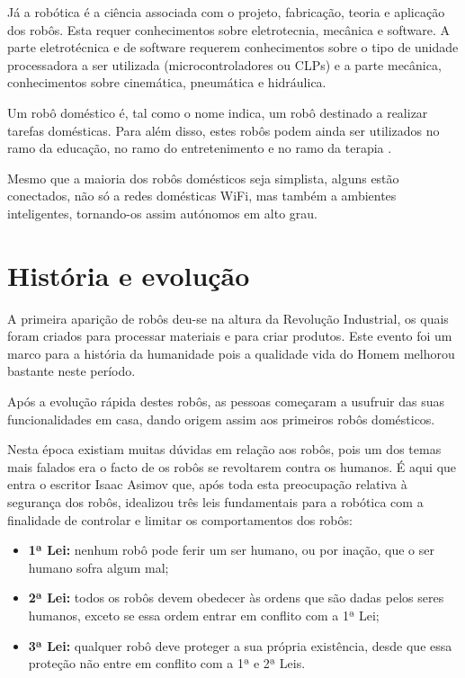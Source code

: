 \documentclass[10pt]{article}
\begin{document}
Já a robótica é a ciência associada com o projeto, fabricação, teoria e aplicação dos robôs. Esta requer conhecimentos sobre eletrotecnia, mecânica e software. A parte eletrotécnica e de software requerem conhecimentos sobre o tipo de unidade processadora a ser utilizada (microcontroladores ou CLPs) e a parte mecânica, conhecimentos sobre cinemática, pneumática e hidráulica.

Um robô doméstico é, tal como o nome indica, um robô destinado a realizar tarefas domésticas. Para além disso, estes robôs podem ainda ser utilizados no ramo da educação, no ramo do entretenimento e no ramo da terapia \cite{dom-rob}.

Mesmo que a maioria dos robôs domésticos seja simplista, alguns estão conectados, não só a redes domésticas WiFi, mas também a ambientes inteligentes, tornando-os assim autónomos em alto grau. 


\section{História e evolução}
\hspace{\parindent}A primeira aparição de robôs deu-se na altura da Revolução Industrial, os quais foram criados para processar materiais e para criar produtos. Este evento foi um marco para a história da humanidade pois a qualidade vida do Homem melhorou bastante neste período.

Após a evolução rápida destes robôs, as pessoas começaram a usufruir das suas funcionalidades em casa, dando origem assim aos primeiros robôs domésticos. 

Nesta época existiam muitas dúvidas em relação aos robôs, pois um dos temas mais falados era o facto de os robôs se revoltarem contra os humanos. É aqui que entra o escritor Isaac Asimov que, após toda esta preocupação relativa à segurança dos robôs, idealizou três leis fundamentais para a robótica com a finalidade de controlar e limitar os comportamentos dos robôs:

\begin{itemize}
    \item \textbf{1ª Lei:} nenhum robô pode ferir um ser humano, ou por inação, que o ser humano sofra algum mal;
    \item \textbf{2ª Lei:} todos os robôs devem obedecer às ordens que são dadas pelos seres humanos, exceto se essa ordem entrar em conflito com a 1ª Lei;
    \item \textbf{3ª Lei:} qualquer robô deve proteger a sua própria existência, desde que essa proteção não entre em conflito com a 1ª e 2ª Leis.
\end{itemize}
\end{document}
